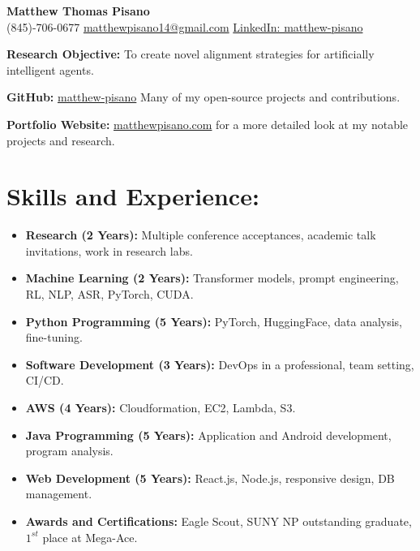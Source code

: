 \documentclass[12pt]{article}
\title{}
\author{\textbf{\LARGE Matthew Thomas Pisano}}
\date{}
\begin{document}
\pagestyle{plain}

\begin{tcolorbox}[width=\linewidth, sharp corners=all, colback=white!90!green, colframe=black]
    
    \begin{center}
        \textbf{\LARGE Matthew Thomas Pisano}\\
        \vspace{0.1in}
        (845)-706-0677 \hspace*{0.3in}
        \href{mailto:matthewpisano14@gmail.com}{matthewpisano14@gmail.com} \hspace*{0.5in}
        \href{https://www.linkedin.com/in/matthew-pisano/}{LinkedIn: matthew-pisano}
    \end{center}
    
\end{tcolorbox}

\vspace{0.1in}

\hspace*{-0.3in}
\textbf{Research Objective:} To create novel alignment strategies for artificially intelligent agents.

\vspace{0.1in}

\hspace*{-0.3in}
\textbf{GitHub:} \href{https://github.com/matthew-pisano}{matthew-pisano} Many of my open-source projects and contributions.

\hspace*{-0.3in}
\textbf{Portfolio Website:} \href{https://matthewpisano.com}{matthewpisano.com} for a more detailed look at my notable projects and research.

\section*{Skills and Experience:}
\begin{itemize}
    \itemsep0em
    \item \textbf{Research (2 Years):} Multiple conference acceptances, academic talk invitations, work in research labs.
    \item \textbf{Machine Learning (2 Years):} Transformer models, prompt engineering, RL, NLP, ASR, PyTorch, CUDA.
    \item \textbf{Python Programming (5 Years):} PyTorch, HuggingFace, data analysis, fine-tuning.
    \item \textbf{Software Development (3 Years):} DevOps in a professional, team setting, CI/CD. 
    \item \textbf{AWS (4 Years):} Cloudformation, EC2, Lambda, S3.
    \item \textbf{Java Programming (5 Years):} Application and Android development, program analysis.
    \item \textbf{Web Development (5 Years):} React.js, Node.js, responsive design, DB management.
    \item \textbf{Awards and Certifications:} Eagle Scout, SUNY NP outstanding graduate, $1^{st}$ place at Mega-Ace.
\end{itemize}
\end{document}
